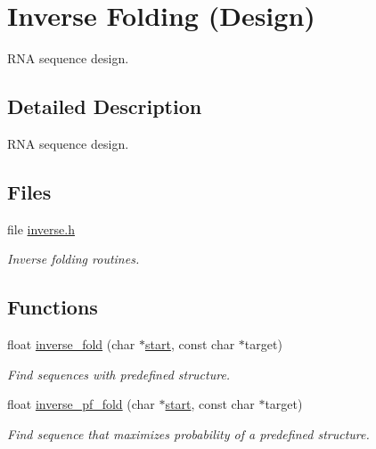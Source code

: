\hypertarget{group__inverse__fold}{}\section{Inverse Folding (Design)}
\label{group__inverse__fold}


R\+NA sequence design.  




\subsection{Detailed Description}
R\+NA sequence design. 

\subsection*{Files}
\begin{DoxyCompactItemize}
\item 
file \mbox{\hyperlink{inverse_8h}{inverse.\+h}}
\begin{DoxyCompactList}\small\item\em Inverse folding routines. \end{DoxyCompactList}\end{DoxyCompactItemize}
\subsection*{Functions}
\begin{DoxyCompactItemize}
\item 
float \mbox{\hyperlink{group__inverse__fold_ga7af026de55d4babad879f2c92559cbbc}{inverse\+\_\+fold}} (char $\ast$\mbox{\hyperlink{special__const_8h_ab53016e6941484f46238d59e2549decb}{start}}, const char $\ast$target)
\begin{DoxyCompactList}\small\item\em Find sequences with predefined structure. \end{DoxyCompactList}\item 
float \mbox{\hyperlink{group__inverse__fold_gaeef52ecbf2a2450ad585a344f9826806}{inverse\+\_\+pf\+\_\+fold}} (char $\ast$\mbox{\hyperlink{special__const_8h_ab53016e6941484f46238d59e2549decb}{start}}, const char $\ast$target)
\begin{DoxyCompactList}\small\item\em Find sequence that maximizes probability of a predefined structure. \end{DoxyCompactList}\end{DoxyCompactItemize}
